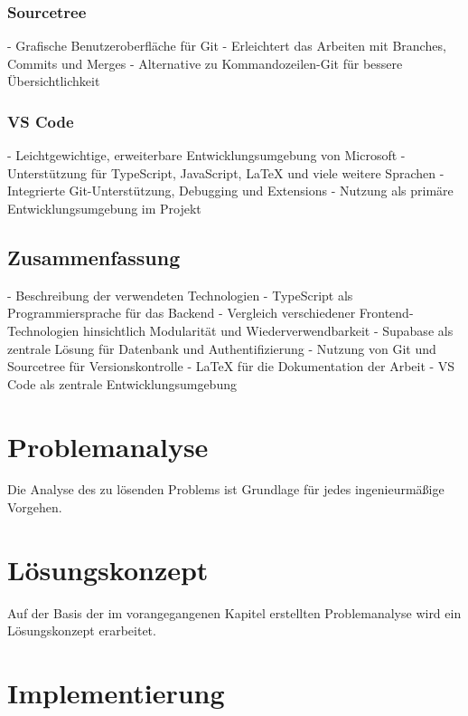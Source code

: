 \documentclass[oneside]{ausarbeitung}
\begin{document}
\subsection{Sourcetree}
- Grafische Benutzeroberfläche für Git  
- Erleichtert das Arbeiten mit Branches, Commits und Merges  
- Alternative zu Kommandozeilen-Git für bessere Übersichtlichkeit  

\subsection{VS Code}
- Leichtgewichtige, erweiterbare Entwicklungsumgebung von Microsoft  
- Unterstützung für TypeScript, JavaScript, LaTeX und viele weitere Sprachen  
- Integrierte Git-Unterstützung, Debugging und Extensions  
- Nutzung als primäre Entwicklungsumgebung im Projekt  

\section{Zusammenfassung}
- Beschreibung der verwendeten Technologien  
- TypeScript als Programmiersprache für das Backend  
- Vergleich verschiedener Frontend-Technologien hinsichtlich Modularität und Wiederverwendbarkeit  
- Supabase als zentrale Lösung für Datenbank und Authentifizierung  
- Nutzung von Git und Sourcetree für Versionskontrolle  
- LaTeX für die Dokumentation der Arbeit  
- VS Code als zentrale Entwicklungsumgebung  



\chapter{Problemanalyse}
\label{cha:problemanalyse}

Die Analyse des zu lösenden Problems ist Grundlage für jedes ingenieurmäßige Vorgehen. 

\chapter{Lösungskonzept}
\label{cha:loesungskonzept}

Auf der Basis der im vorangegangenen Kapitel erstellten Problemanalyse wird ein Lösungskonzept erarbeitet.

\chapter{Implementierung}
\label{cha:implementierung}
\end{document}
